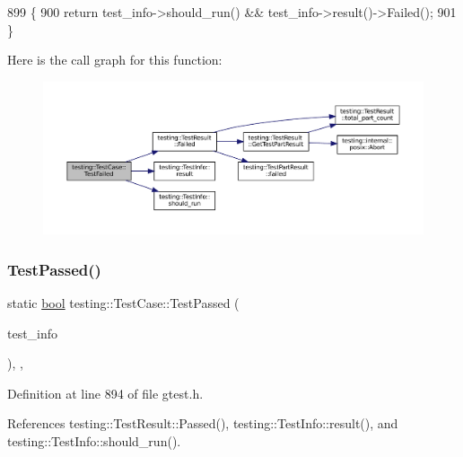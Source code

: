 \begin{DoxyCode}
899                                                     \{
900     \textcolor{keywordflow}{return} test\_info->should\_run() && test\_info->result()->Failed();
901   \}
\end{DoxyCode}
Here is the call graph for this function\+:
\nopagebreak
\begin{figure}[H]
\begin{center}
\leavevmode
\includegraphics[width=350pt]{classtesting_1_1TestCase_a5922884cb8b4819e869146dc315a1ac1_cgraph}
\end{center}
\end{figure}
\mbox{\label{classtesting_1_1TestCase_ad8d9e1ebc410000b679002ba71d78686}} 
\subsubsection{\texorpdfstring{Test\+Passed()}{TestPassed()}}
{\footnotesize\ttfamily static \hyperlink{classbool}{bool} testing\+::\+Test\+Case\+::\+Test\+Passed (\begin{DoxyParamCaption}\item[{const \hyperlink{classtesting_1_1TestInfo}{Test\+Info} $\ast$}]{test\+\_\+info }\end{DoxyParamCaption})\hspace{0.3cm}{\ttfamily [inline]}, {\ttfamily [static]}, {\ttfamily [private]}}



Definition at line 894 of file gtest.\+h.



References testing\+::\+Test\+Result\+::\+Passed(), testing\+::\+Test\+Info\+::result(), and testing\+::\+Test\+Info\+::should\+\_\+run().


